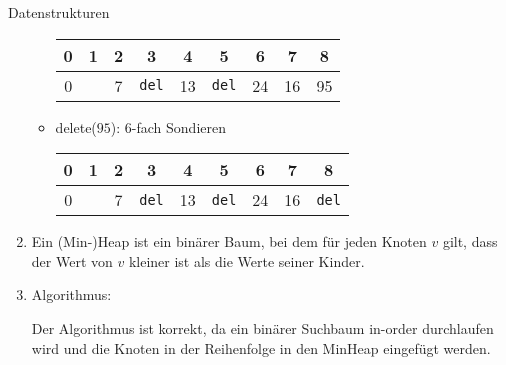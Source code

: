 \documentclass{article}
\begin{document}
\begin{exercise}{Datenstrukturen}
\begin{solution}
\begin{enumerate}
\begin{itemize}
\begin{tabular}{c|c|c|c|c|c|c|c|c}
                      0 & 1 & 2 & 3            & 4  & 5            & 6  & 7  & 8  \\
                      \hline
                      0 &   & 7 & \texttt{del} & 13 & \texttt{del} & 24 & 16 & 95 \\
                    \end{tabular}
              \item delete($95$): 6-fach Sondieren \begin{tabular}{c|c|c|c|c|c|c|c|c}
                      0 & 1 & 2 & 3            & 4  & 5            & 6  & 7  & 8            \\
                      \hline
                      0 &   & 7 & \texttt{del} & 13 & \texttt{del} & 24 & 16 & \texttt{del} \\
                    \end{tabular}
            \end{itemize}
      \item Ein (Min-)Heap ist ein binärer Baum, bei dem für jeden Knoten $v$ gilt, dass der Wert von $v$ kleiner ist als die Werte seiner Kinder.
      \item Algorithmus:\par
            
            Der Algorithmus ist korrekt, da ein binärer Suchbaum in-order durchlaufen wird und die Knoten in der Reihenfolge in den MinHeap eingefügt werden.
    \end{enumerate}
  \end{solution}
\end{exercise}
\end{document}
